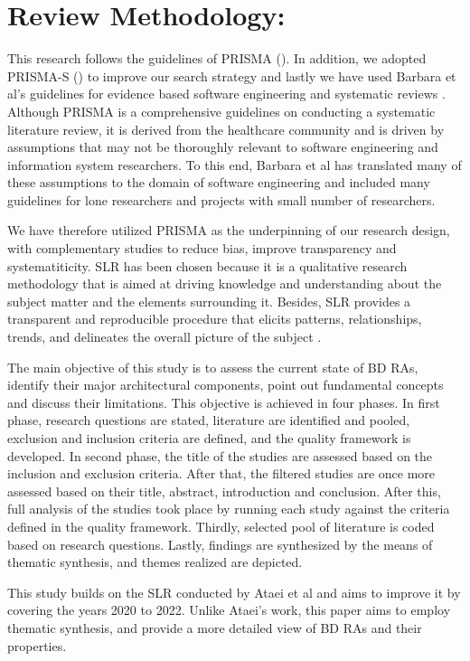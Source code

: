 \documentclass[review]{elsarticle}
\begin{document}
\section{Review Methodology:}
This research follows the guidelines of PRISMA (\cite{page2021prisma}). In addition, we adopted PRISMA-S (\cite{rethlefsen2021prisma}) to improve our search strategy and lastly we have used Barbara et al's guidelines for evidence based software engineering and systematic reviews \cite{kitchenham2015evidence}. Although PRISMA is a comprehensive guidelines on conducting a systematic literature review, it is derived from the healthcare community and is driven by assumptions that may not be thoroughly relevant to software engineering and information system researchers. To this end, Barbara et al \cite{kitchenham2015evidence} has translated many of these assumptions to the domain of software engineering and included many guidelines for lone researchers and projects with small number of researchers.

We have therefore utilized PRISMA as the underpinning of our research design, with complementary studies to reduce bias, improve transparency and systematiticity. SLR has been chosen because it is a qualitative research methodology that is aimed at driving knowledge and understanding about the subject matter and the elements surrounding it. Besides, SLR provides a transparent and reproducible procedure that elicits patterns, relationships, trends, and delineates the overall picture of the subject \cite{borrego2014systematic}.

The main objective of this study is to assess the current state of BD RAs, identify their major architectural components, point out fundamental concepts and discuss their limitations. This objective is achieved in four phases. In first phase, research questions are stated, literature are identified and pooled, exclusion and inclusion criteria are defined, and the quality framework is developed. In second phase, the title of the studies are assessed based on the inclusion and exclusion criteria. After that, the filtered studies are once more assessed based on their title, abstract, introduction and conclusion. After this, full analysis of the studies took place by running each study against the criteria defined in the quality framework. Thirdly, selected pool of literature is coded based on research questions. Lastly, findings are synthesized by the means of thematic synthesis, and themes realized are depicted.

This study builds on the SLR conducted by Ataei et al \cite{AtaeiACIS} and aims to improve it by covering the years 2020 to 2022. Unlike Ataei's work, this paper aims to employ thematic synthesis, and provide a more detailed view of BD RAs and their properties.
\end{document}
